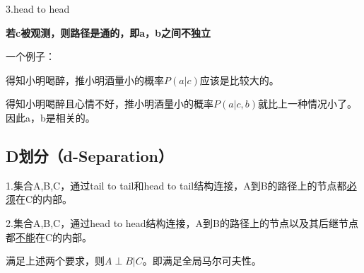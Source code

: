 \documentclass[UTF8]{ctexart} %
\begin{document}
			3.head to head
			\begin{figure}[H]
			\end{figure}
			\textbf{若c被观测，则路径是通的，即a，b之间不独立}
			
			一个例子：
			\begin{figure}[H]
			\end{figure}
			得知小明喝醉，推小明酒量小的概率$P(a|c)$应该是比较大的。
			
			得知小明喝醉且心情不好，推小明酒量小的概率$P(a|c,b)$就比上一种情况小了。因此a，b是相关的。
			
		\subsection{D划分（d-Separation）}
			1.集合A,B,C，通过tail to tail和head to tail结构连接，A到B的路径上的节点都\uline{必须}在C的内部。
			
			2.集合A,B,C，通过head to head结构连接，A到B的路径上的节点以及其后继节点都\uline{不能}在C的内部。
			
			满足上述两个要求，则$A\perp B|C$。即满足全局马尔可夫性。
			
\end{document}
